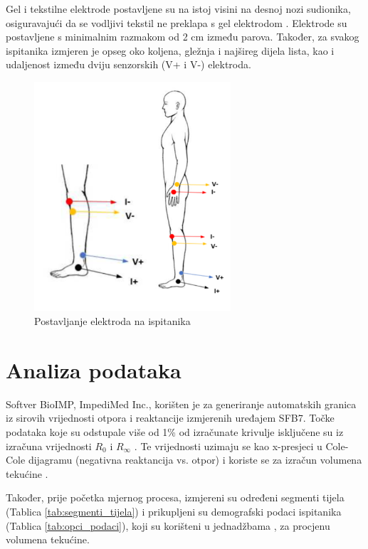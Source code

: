 \documentclass[../diplomski_rad.tex]{subfiles}
\begin{document}
Gel i tekstilne elektrode postavljene su na istoj visini na desnoj nozi sudionika, osiguravajući da se 
vodljivi tekstil ne preklapa s gel elektrodom \cite{Piper2023}. 
Elektrode su postavljene s minimalnim razmakom od 2 cm između parova. 
Također, za svakog ispitanika izmjeren je opseg oko koljena, gležnja i najšireg dijela lista, 
kao i udaljenost između dviju senzorskih (V+ i V-) elektroda.

\begin{figure}[htb]
    \centering
    \includegraphics[width=0.65\textwidth]{Figures/postavljanje_elektroda.png} 
    \caption{Postavljanje elektroda na ispitanika \cite{Piper2023}}
    \label{slk:postavljanje_elektroda}
\end{figure}

\section{Analiza podataka}

Softver BioIMP, ImpediMed Inc., korišten je za generiranje automatskih granica iz sirovih 
vrijednosti otpora i reaktancije izmjerenih uređajem SFB7. 
Točke podataka koje su odstupale više od 1\% od izračunate krivulje isključene 
su iz izračuna vrijednosti $R_{0}$ i $R_{\infty}$ \cite{Piper2023}. 
Te vrijednosti uzimaju se kao x-presjeci u Cole-Cole dijagramu (negativna reaktancija vs. otpor) 
i koriste se za izračun volumena tekućine \cite{Piper2023}.

Također, prije početka mjernog procesa, izmjereni su određeni segmenti tijela (Tablica \ref{tab:segmenti_tijela}) i 
prikupljeni su demografski podaci ispitanika (Tablica \ref{tab:opci_podaci}), 
koji su korišteni u jednadžbama \cite{Sanchez2013}, \cite{Delano2022} za procjenu volumena tekućine.
\end{document}
